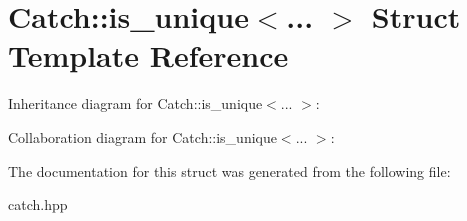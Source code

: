 \hypertarget{structCatch_1_1is__unique}{}\section{Catch\+:\+:is\+\_\+unique$<$... $>$ Struct Template Reference}
\label{structCatch_1_1is__unique}


Inheritance diagram for Catch\+:\+:is\+\_\+unique$<$... $>$\+:


Collaboration diagram for Catch\+:\+:is\+\_\+unique$<$... $>$\+:


The documentation for this struct was generated from the following file\+:\begin{DoxyCompactItemize}
\item 
catch.\+hpp\end{DoxyCompactItemize}
